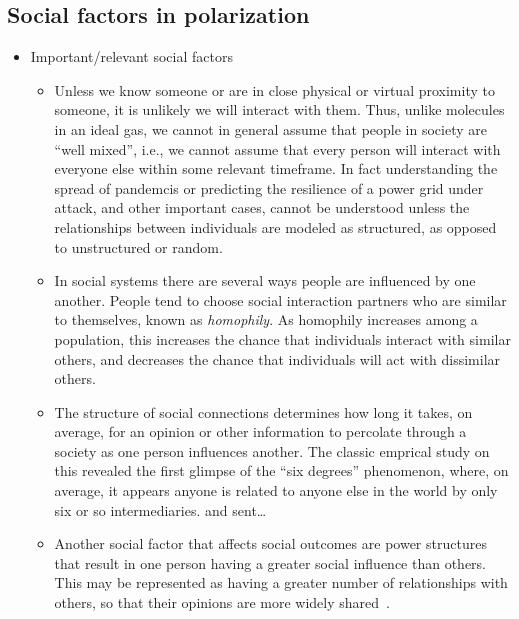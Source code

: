 \documentclass[12pt,letterpaper]{article}
\begin{document}
\subsection{Social factors in polarization}

\begin{itemize}
  \item 
    Important/relevant social factors
    \begin{itemize}
      \item 
        Unless we know someone or are in close physical or virtual proximity to someone, it is
        unlikely we will interact with them. Thus, unlike molecules in an
        ideal gas, we cannot in general assume that people in society are
        ``well mixed'', i.e., we cannot assume 
        that every person will interact with everyone else within some 
        relevant timeframe. In fact understanding
        the spread of pandemcis or predicting the resilience of
        a power grid under attack, and other important cases,
        cannot be understood unless the relationships
        between individuals are modeled as structured, as opposed to unstructured
        or random.
      \item
        In social systems there are several ways people are influenced by one
        another. People tend to choose social interaction partners who 
        are similar to themselves, known as \emph{homophily}. As homophily
        increases among a population, this
        increases the chance that individuals interact with similar others, 
        and decreases the chance that individuals will act with dissimilar
        others.
      \item
        The structure of social connections determines how long it takes, on average, for an opinion
        or other information to percolate through a society as one person
        influences another. The classic emprical study on this revealed the
        first glimpse of the ``six degrees'' phenomenon, where, on average,
        it appears anyone is related to anyone else in the world by only
        six or so intermediaries.  and 
        sent\ldots
      \item
        Another social factor that affects social outcomes are power structures
        that result in one person having a greater social influence than others.
        This may be represented as having a greater number of relationships
        with others, so that their opinions are more widely shared~\cite{French1956,Friedkin1986}.
    \end{itemize}


\end{itemize}
\end{document}
